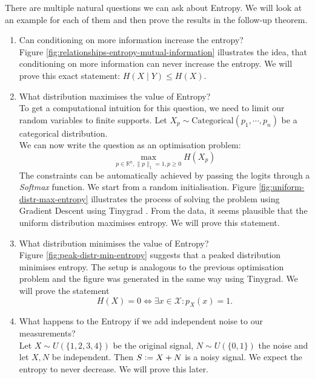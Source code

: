 \begin{remark}
    There are multiple natural questions we can ask about Entropy.
    We will look at an example for each of them and then prove the results in the follow-up theorem.
    \begin{enumerate}
        \item Can conditioning on more information increase the entropy? \\
            Figure \ref{fig:relationships-entropy-mutual-information} illustrates the idea, that conditioning on more information can never increase the entropy.
            We will prove this exact statement: $H(X \mid Y) \le H(X)$.

        \item What distribution maximises the value of Entropy? \\
            To get a computational intuition for this question, we need to limit our random variables to finite supports.
            Let $X_p \sim \mathrm{Categorical}(p_1, \cdots, p_n)$ be a categorical distribution. \\
            We can now write the question as an optimisation problem:
            \[
                \max_{p \in \mathbb{R}^{n}, \|p\|_1=1, p \ge 0}{H(X_p)}
            \]
            The constraints can be automatically achieved by passing the logits through a \textit{Softmax} function.
            We start from a random initialisation.
            Figure \ref{fig:uniform-distr-max-entropy} illustrates the process of solving the problem using Gradient Descent using Tinygrad \cite{Tinygrad}.
            From the data, it seems plausible that the uniform distribution maximises entropy.
            We will prove this statement.

        \item What distribution minimises the value of Entropy? \\
            Figure \ref{fig:peak-distr-min-entropy} suggests that a peaked distribution minimises entropy.
            The setup is analogous to the previous optimisation problem and the figure was generated in the same way using Tinygrad.
            We will prove the statement
            \[
                H(X) = 0 \iff \exists x \in \mathcal{X}: p_X(x) = 1.
            \]

        \item What happens to the Entropy if we add independent noise to our measurements? \\
            Let $X \sim U(\{1, 2, 3, 4\})$ be the original signal, $N \sim U(\{0, 1\})$ the noise and let $X, N$ be independent. 
            Then $S \vcentcolon= X + N$ is a noisy signal. We expect the entropy to never decrease. We will prove this later.

    \end{enumerate}
\end{remark}

